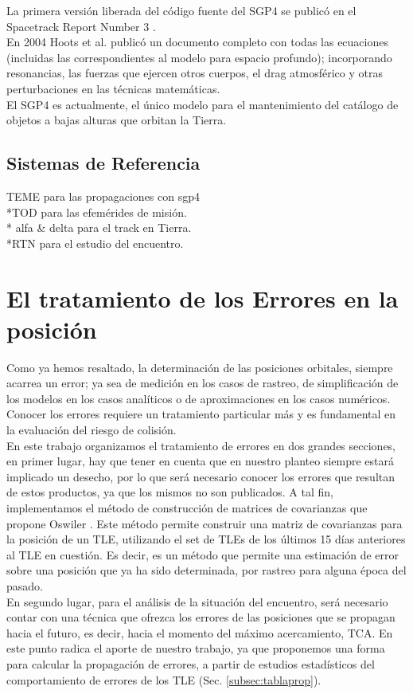 La primera versi\'on liberada del c\'odigo fuente del SGP4 se public\'o en el Spacetrack Report Number 3 \citep{spacetrackreport3}.\\
En 2004 Hoots et al. public\'o un documento completo con todas las ecuaciones (incluidas las correspondientes al modelo para espacio profundo); incorporando resonancias, las fuerzas que ejercen otros cuerpos, el drag atmosf\'erico y otras perturbaciones en las t\'ecnicas matem\'aticas.\\

El SGP4 es actualmente, el \'unico modelo para el mantenimiento del cat\'alogo de objetos a bajas alturas que orbitan la Tierra. 

\subsection*{Sistemas de Referencia}
\noindent*TEME para las propagaciones con sgp4\\
*TOD para las efem\'erides de misi\'on.\\
* alfa \& delta para el track en Tierra.\\
*RTN para el estudio del encuentro.\\

\section{El tratamiento de los Errores en la posici\'on}

Como ya hemos resaltado, la determinaci\'on de las posiciones orbitales, siempre acarrea un error; ya sea de medici\'on en los casos de rastreo, de simplificaci\'on de los modelos en los casos anal\'iticos o de aproximaciones en los casos num\'ericos.\\
Conocer los errores requiere un tratamiento particular m\'as y es fundamental en la evaluaci\'on del riesgo de colisi\'on.\\

En este trabajo organizamos el tratamiento de errores en dos grandes secciones, en primer lugar, hay que tener en cuenta que en nuestro planteo siempre estar\'a implicado un desecho, por lo que ser\'a necesario conocer los errores que resultan de estos productos, ya que los mismos no son publicados. A tal fin, implementamos el m\'etodo de construcci\'on de matrices de covarianzas que propone Oswiler \citep{Osweiler}. Este m\'etodo permite construir una matriz de covarianzas para la posici\'on de un TLE, utilizando el set de TLEs de los \'ultimos 15 d\'ias anteriores al TLE en cuesti\'on. Es decir, es un m\'etodo que permite una estimaci\'on de error sobre una posici\'on que ya ha sido determinada, por rastreo para alguna \'epoca del pasado.\\
En segundo lugar, para el an\'alisis de la situaci\'on del encuentro, ser\'a necesario contar con una t\'ecnica que ofrezca los errores de las posiciones que se propagan hacia el futuro, es decir, hacia el momento del m\'aximo acercamiento, TCA. En este punto radica el aporte de nuestro trabajo, ya que proponemos una forma para calcular la propagaci\'on de errores, a partir de estudios estad\'isticos del comportamiento de errores de los TLE (Sec. \ref{subsec:tablaprop}).\\

